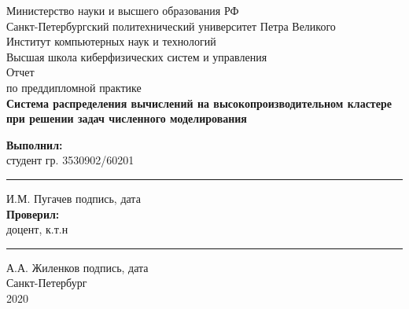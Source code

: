 \begin{titlepage}
\newpage
\begin{center}
	Министерство науки и высшего образования РФ\\
	Санкт-Петербургский политехнический университет Петра Великого\\
	Институт компьютерных наук и технологий\\
	Высшая школа киберфизических систем и управления\\
	
	\vspace{7cm}
	Отчет\\
	по преддипломной практике\\
	\Large\textbf{Система распределения вычислений на высокопроизводительном кластере при решении задач численного моделирования}\\
\end{center}
\vspace{3cm}
\textbf{Выполнил:}\\
студент гр. 3530902/60201 \hfill 
\rule{4.5cm}{0.4pt} И.М. Пугачев
\hspace*{9cm} подпись, дата\\
\flushleft\textbf{Проверил:}\\
доцент, к.т.н \hfill 
\rule{4cm}{0.4pt}  А.А. Жиленков
\hspace*{9cm} подпись, дата\\
\vfill
\centering Санкт-Петербург\\2020
\end{titlepage}